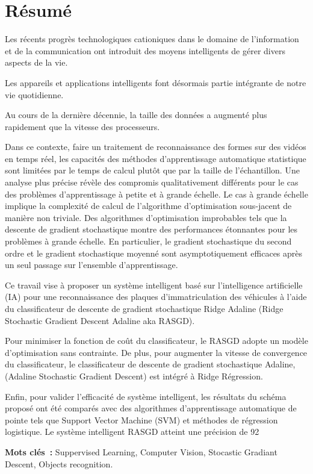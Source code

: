 \chapter*{Résumé} 
	
	Les récents progrès technologiques cationiques dans le domaine de l'information et de la communication ont introduit des moyens intelligents de gérer divers aspects de la vie.
	
	Les appareils et applications intelligents font désormais partie intégrante de notre vie quotidienne.
	
	Au cours de la dernière décennie, la taille des données a augmenté plus rapidement que la vitesse des processeurs. 
	
	Dans ce contexte, faire un traitement de reconnaissance des formes sur des vidéos en temps réel, les capacités des méthodes d'apprentissage automatique statistique sont limitées par le temps de calcul plutôt que par la taille de l'échantillon. Une analyse plus précise révèle des compromis qualitativement différents pour le cas des problèmes d'apprentissage à petite et à grande échelle. Le cas à grande échelle implique la complexité de calcul de l'algorithme d'optimisation sous-jacent de manière non triviale. Des algorithmes d'optimisation improbables tels que la descente de gradient stochastique montre des performances étonnantes pour les problèmes à grande échelle. En particulier, le gradient stochastique du second ordre et le gradient stochastique moyenné sont asymptotiquement efficaces après un seul passage sur l'ensemble d'apprentissage.
	
	Ce travail vise à proposer un système intelligent basé sur l'intelligence artificielle (IA) pour une reconnaissance des plaques d’immatriculation des véhicules à l'aide du classificateur de descente de gradient stochastique Ridge Adaline (Ridge Stochastic Gradient Descent Adaline aka RASGD).
	
	Pour minimiser la fonction de coût du classificateur, le RASGD adopte un modèle d'optimisation sans contrainte. De plus, pour augmenter la vitesse de convergence du classificateur, le classificateur de descente de gradient stochastique Adaline, (Adaline Stochastic Gradient Descent) est intégré à Ridge Régression.
	
	Enfin, pour valider l'efficacité de système intelligent, les résultats du schéma proposé ont été comparés avec des algorithmes d'apprentissage automatique de pointe tels que Support Vector Machine (SVM) et méthodes de régression logistique. Le système intelligent RASGD atteint une précision de 92%
	
	
	
	
	\vspace{2 cm}

	\begin{singlespace}
		\textbf{Mots clés~:} Suppervised Learning, Computer Vision, Stocastic Gradiant Descent, Objects recognition. 
	\end{singlespace}